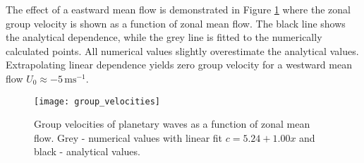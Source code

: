 The effect of a eastward mean flow is demonstrated in Figure \ref{fig:groupvelocities} where the zonal group velocity is shown as a function of zonal mean flow. The black line shows the analytical dependence, while the grey line is fitted to the numerically calculated points. All numerical values slightly overestimate the analytical values. Extrapolating linear dependence yields zero group velocity for a westward mean flow $U_0 \approx -5\, \text{m}\text{s}^{-1}$.
	\begin{figure}[htbp]
		\centering
		\texttt{[image: group\_velocities]}
		\caption{Group velocities of planetary waves as a function of zonal mean flow. Grey - numerical values with linear fit $c = 5.24 + 1.00 x$ and black - analytical values.}
		\label{fig:groupvelocities}
	\end{figure}